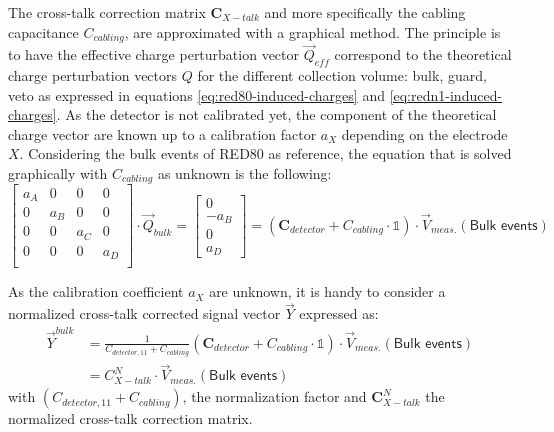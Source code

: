 The cross-talk correction matrix $\bm{C}_{X-talk}$ and more specifically the cabling capacitance $C_{cabling}$, are approximated with a graphical method. The principle is to have the effective charge perturbation vector $\vec{Q}_{eff}$ correspond to the theoretical charge perturbation vectors $Q$ for the different collection volume: bulk, guard, veto as expressed in equations \ref{eq:red80-induced-charges} and \ref{eq:redn1-induced-charges}. As the detector is not calibrated yet, the component of the theoretical charge vector are known up to a calibration factor $a_X$ depending on the electrode $X$. Considering the bulk events of RED80 as reference, the equation that is solved graphically with $C_{cabling}$ as unknown is the following:
\begin{equation}
\label{eq:crosstalk-correction}
\begin{bmatrix}
a_A & 0 & 0 & 0 \\
0 & a_B & 0 & 0 \\
0 & 0 & a_C & 0 \\
0 & 0 & 0 & a_D \\
\end{bmatrix}
\cdot
\vec{Q}_{bulk}
=
\begin{bmatrix}
0 \\ -a_B \\ 0 \\ a_D
\end{bmatrix} 
=
\left( \bm{C}_{detector} + C_{cabling} \cdot \mathbb{1} \right) \cdot \vec{V}_{meas.}(\textsf{Bulk events})
\end{equation}

As the calibration coefficient $a_X$ are unknown, it is handy to consider a normalized cross-talk corrected signal vector $\vec{Y}$ expressed as:
\begin{equation}
\begin{split}
\vec{Y}^{bulk}
&=
\frac{1}{C_{detector, 11} + C_{cabling}}
\left( \bm{C}_{detector} + C_{cabling} \cdot \mathbb{1} \right) \cdot \vec{V}_{meas.}(\textsf{Bulk events})
\\
&= C_{X-talk}^N \cdot \vec{V}_{meas.}(\textsf{Bulk events})
\end{split}
\end{equation}
with $(C_{detector, 11} + C_{cabling})$, the normalization factor and $\bm{C}_{X-talk}^N$ the normalized cross-talk correction matrix.

